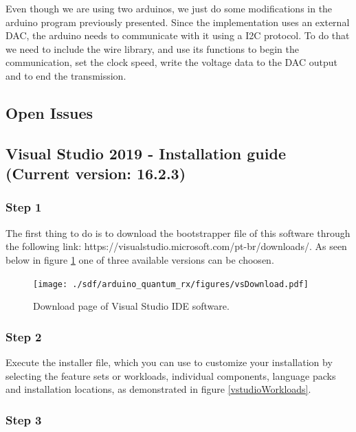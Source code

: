 \begin{refsection}
\begin{figure}[H]
	\end{figure}

	Even though we are using two arduinos, we just do some modifications in the arduino program previously presented. Since the implementation uses an external DAC, the arduino needs to communicate with it using a I2C protocol. To do that we need to include the wire library, and use its functions to begin the communication, set the clock speed, write the voltage data to the DAC output and to end the transmission. 
	
	
	\subsection{Open Issues}
	
	\clearpage
	\subsection{Visual Studio 2019 - Installation guide (Current version: 16.2.3)}
	
	\subsubsection{Step 1}
	
	The first thing to do is to download the bootstrapper file of this software through the following link: https://visualstudio.microsoft.com/pt-br/downloads/. As seen below in figure \ref{vstudio} one of three available versions can be choosen.
	
	\begin{figure}[H]
		\centering
		\texttt{[image: ./sdf/arduino\_quantum\_rx/figures/vsDownload.pdf]}
		\caption{Download page of Visual Studio IDE software.}
		\label{vstudio}
	\end{figure}
	
	
	\subsubsection{Step 2}
	
	Execute the installer file, which you can use to customize your installation by selecting the feature sets or workloads, individual components, language packs and installation locations, as demonstrated in figure \ref{vstudioWorkloads}.
	
	
	
	\subsubsection{Step 3}
	

\end{refsection}
